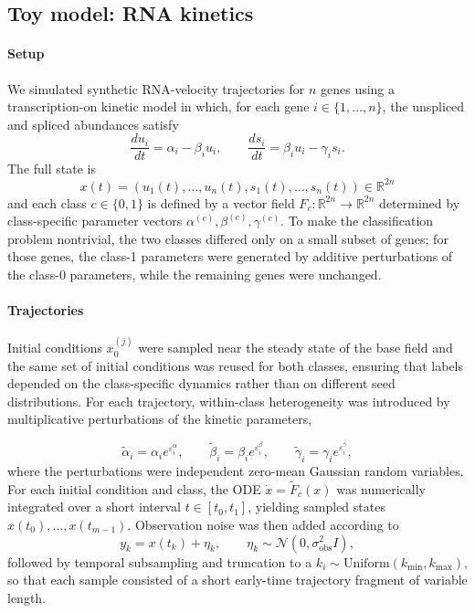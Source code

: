 \documentclass{article}
\theoremstyle{remark}
\theoremstyle{plain}
\begin{document}
\subsection{Toy model: RNA kinetics}

\paragraph{Setup} We simulated synthetic RNA-velocity trajectories for $n$ genes using a transcription-on kinetic model in which, for each gene $i\in\{1,\dots,n\}$, the unspliced and spliced abundances satisfy
$$\frac{du_i}{dt}=\alpha_i-\beta_i u_i,\qquad
\frac{ds_i}{dt}=\beta_i u_i-\gamma_i s_i.$$
The full state is $$x(t)=(u_1(t),\dots,u_n(t),s_1(t),\dots,s_n(t))\in\mathbb{R}^{2n}$$ and each class $c\in\{0,1\}$ is defined by a vector field $F_c:\mathbb{R}^{2n}\to\mathbb{R}^{2n}$ determined by class-specific parameter vectors $\alpha^{(c)},\beta^{(c)},\gamma^{(c)}$. To make the classification problem nontrivial, the two classes differed only on a small subset of genes; for those genes, the class-1 parameters were generated by additive perturbations of the class-0 parameters, while the remaining genes were unchanged.

\paragraph{Trajectories} Initial conditions $x_0^{(j)}$ were sampled near the steady state of the base field and the same set of initial conditions was reused for both classes, ensuring that labels depended on the class-specific dynamics rather than on different seed distributions. For each trajectory, within-class heterogeneity was introduced by multiplicative perturbations of the kinetic parameters,

$$\tilde\alpha_i=\alpha_i e^{\varepsilon_i^\alpha},\qquad
\tilde\beta_i=\beta_i e^{\varepsilon_i^\beta},\qquad
\tilde\gamma_i=\gamma_i e^{\varepsilon_i^\gamma},$$
where the perturbations were independent zero-mean Gaussian random variables. For each initial condition and class, the ODE $\dot x=\tilde F_c(x)$ was numerically integrated over a short interval $t\in[t_0,t_1]$, yielding sampled states $x(t_0),\dots,x(t_{m-1})$. Observation noise was then added according to
$$y_k=x(t_k)+\eta_k,\qquad \eta_k\sim\mathcal N(0,\sigma_{\mathrm{obs}}^2 I),$$
followed by temporal subsampling and truncation to a $k_i\sim\mathrm{Uniform}(k_{\min},k_{\max})$, so that each sample consisted of a short early-time trajectory fragment of variable length.
\end{document}
